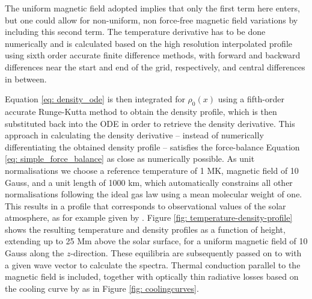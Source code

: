 \noindent
The uniform magnetic field adopted implies that only the first term here enters, but one could allow for non-uniform, non force-free magnetic field variations by including this second term. The temperature derivative has to be done numerically and is calculated based on the high resolution interpolated profile using sixth order accurate finite difference methods, with forward and backward differences near the start and end of the grid, respectively, and central differences in between.


Equation \eqref{eq: density_ode} is then integrated for $\rho_0(x)$ using a fifth-order accurate Runge-Kutta method to obtain the density profile, which is then substituted back into the ODE in order to retrieve the density derivative. This approach in calculating the density derivative -- instead of numerically differentiating the obtained density profile -- satisfies the force-balance Equation \eqref{eq: simple_force_balance} as close as numerically possible. As unit normalisations we choose a reference temperature of 1 MK, magnetic field of 10 Gauss, and a unit length of 1000 km, which automatically constrains all other normalisations following the ideal gas law using a mean molecular weight of one. This results in a profile that corresponds to observational values of the solar atmosphere, as for example given by \citet{book_priest}. Figure \ref{fig: temperature-density-profile} shows the resulting temperature and density profiles as a function of height, extending up to 25 Mm above the solar surface, for a uniform magnetic field of 10 Gauss along the $z$-direction. These equilibria are subsequently passed on to {\legolas} with a given wave vector to calculate the spectra. Thermal conduction parallel to the magnetic field is included, together with optically thin radiative losses based on the {\spexdm} cooling curve by \citet{schure2009} as in Figure \ref{fig: coolingcurves}.


